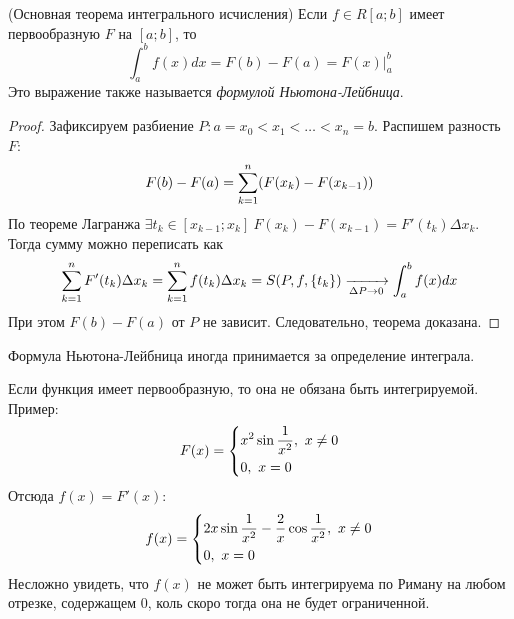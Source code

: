 \begin{theorem} (Основная теорема интегрального исчисления)
	Если $f \in R[a; b]$ имеет первообразную $F$ на $[a; b]$, то
	\[
		\int_a^b f(x)dx = F(b) - F(a) = F(x)\Big|_a^b
	\]
	Это выражение также называется \textit{формулой Ньютона-Лейбница}.
\end{theorem}

\begin{proof}
	Зафиксируем разбиение $P \colon a = x_0 < x_1 < \ldots < x_n = b$. Распишем разность $F$:
	\[
		F(b) - F(a) = \sum\limits_{k = 1}^n (F(x_k) - F(x_{k - 1}))
	\]
	По теореме Лагранжа $\exists t_k \in [x_{k - 1};x_k]\ F(x_k) - F(x_{k - 1}) = F'(t_k)\Delta x_k$. Тогда сумму можно переписать как
	\[
		\sum\limits_{k = 1}^nF'(t_k)\Delta x_k = \sum\limits_{k = 1}^nf(t_k)\Delta x_k = S(P, f, \{t_k\}) \xrightarrow[\Delta P \to 0]{} \int_a^b f(x)dx
	\]
	При этом $F(b) - F(a)$ от $P$ не зависит. Следовательно, теорема доказана.
\end{proof}

\begin{note}
	Формула Ньютона-Лейбница иногда принимается за определение интеграла.
\end{note}

\begin{note}
	Если функция имеет первообразную, то она не обязана быть интегрируемой. Пример:
	\[
		F(x) = \left\{\begin{aligned}
			&{x^2 \sin \frac{1}{x^2},\ x \neq 0}
			\\
			&{0,\ x = 0}
		\end{aligned}\right.
	\]
	Отсюда $f(x) = F'(x)$:
	\[
		f(x) = \left\{\begin{aligned}
			&{2x \sin \frac{1}{x^2} - \frac{2}{x}\cos \frac{1}{x^2},\ x \neq 0}
			\\
			&{0,\ x = 0}
		\end{aligned}\right.
	\]
	Несложно увидеть, что $f(x)$ не может быть интегрируема по Риману на любом отрезке, содержащем 0, коль скоро тогда она не будет ограниченной.
\end{note}